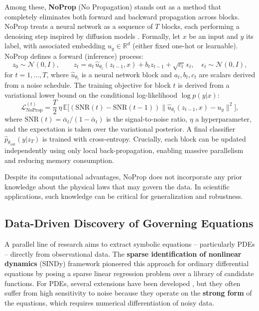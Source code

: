 \documentclass[preprint,12pt]{elsarticle}
\begin{document}
Among these, \textbf{NoProp} (No Propagation) \cite{li2025noprop} stands out as a method that completely eliminates both forward and backward propagation across blocks. NoProp treats a neural network as a sequence of $T$ blocks, each performing a denoising step inspired by diffusion models \cite{sohl2015deep,ho2020denoising,song2021maximum}. Formally, let $x$ be an input and $y$ its label, with associated embedding $u_y \in \mathbb{R}^d$ (either fixed one-hot or learnable). NoProp defines a forward (inference) process:
\begin{equation}
\label{eq:noprop-forward}
z_0 \sim \mathcal{N}(0,I),\qquad 
z_t = a_t\,\hat{u}_{\theta_t}(z_{t-1},x) + b_t z_{t-1} + \sqrt{c_t}\,\epsilon_t,\quad \epsilon_t\sim\mathcal{N}(0,I),
\end{equation}
for $t=1,\dots,T$, where $\hat{u}_{\theta_t}$ is a neural network block and $a_t,b_t,c_t$ are scalars derived from a noise schedule. The training objective for block $t$ is derived from a variational lower bound on the conditional log-likelihood $\log p(y|x)$:
\begin{equation}
\label{eq:noprop-loss}
\mathcal{L}_{\text{NoProp}}^{(t)} = \frac{T}{2}\,\eta\,\mathbb{E}\bigl[(\mathrm{SNR}(t)-\mathrm{SNR}(t-1))\|\hat{u}_{\theta_t}(z_{t-1},x)-u_y\|^2\bigr],
\end{equation}
where $\mathrm{SNR}(t)=\bar\alpha_t/(1-\bar\alpha_t)$ is the signal-to-noise ratio, $\eta$ a hyperparameter, and the expectation is taken over the variational posterior. A final classifier $\hat{p}_{\theta_{\text{out}}}(y|z_T)$ is trained with cross-entropy. Crucially, each block can be updated independently using only local back-propagation, enabling massive parallelism and reducing memory consumption.

Despite its computational advantages, NoProp does not incorporate any prior knowledge about the physical laws that may govern the data. In scientific applications, such knowledge can be critical for generalization and robustness.

\subsection{Data-Driven Discovery of Governing Equations}
\label{sec:equation-discovery}

A parallel line of research aims to extract symbolic equations -- particularly PDEs -- directly from observational data. The \textbf{sparse identification of nonlinear dynamics} (SINDy) framework \cite{brunton2016discovering} pioneered this approach for ordinary differential equations by posing a sparse linear regression problem over a library of candidate functions. For PDEs, several extensions have been developed \cite{rudy2017data,schaeffer2017learning,raissi2018hidden,gurevich2019robust,reinbold2020using,messenger2021weak,kaheman2020sindy}, but they often suffer from high sensitivity to noise because they operate on the \textbf{strong form} of the equations, which requires numerical differentiation of noisy data.
\end{document}
